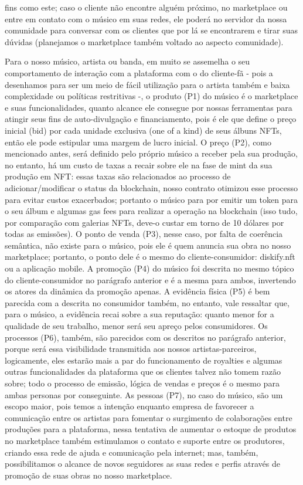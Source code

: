 \documentclass[onecolumn,12pt]{asme2ej}
\begin{document}
fins como este; caso o cliente não encontre alguém próximo, no marketplace ou entre em contato com o músico em suas redes, ele poderá no servidor da nossa comunidade para conversar com os clientes que por lá se encontrarem e tirar suas dúvidas (planejamos o marketplace também voltado ao aspecto comunidade).

Para o nosso músico, artista ou banda, em muito se assemelha o seu comportamento de interação com a plataforma com o do cliente-fã - pois a desenhamos para ser um meio de fácil utilização para o artista também e baixa complexidade ou políticas restritivas -, o produto (P1) do músico é o marketplace e suas funcionalidades, quanto alcance ele consegue por nossas ferramentas para atingir seus fins de auto-divulgação e financiamento, pois é ele que define o preço inicial (bid) por cada unidade exclusiva (one of a kind) de seus álbuns NFTs, então ele pode estipular uma margem de lucro inicial. O preço (P2), como mencionado antes, será definido pelo próprio músico a receber pela sua produção, no entanto, há um custo de taxas a recair sobre ele na fase de mint da sua produção em NFT: essas taxas são relacionados ao processo de adicionar/modificar o status da blockchain, nosso contrato otimizou esse processo para evitar custos exacerbados; portanto o músico para por emitir um token para o seu álbum e algumas gas fees para realizar a operação na blockchain (isso tudo, por comparação com galerias NFTs, deve-o custar em torno de 10 dólares por todas as emissões). O ponto de venda (P3), nesse caso, por falta de coerência semântica, não existe para o músico, pois ele é quem anuncia sua obra no nosso marketplace; portanto, o ponto dele é o mesmo do cliente-consumidor: diskify.nft ou a aplicação mobile. A promoção (P4) do músico foi descrita no mesmo tópico do cliente-consumidor no parágrafo anterior e é a mesma para ambos, invertendo os atores da dinâmica da promoção apenas. A evidência física (P5) é bem parecida com a descrita no consumidor também, no entanto, vale ressaltar que, para o músico, a evidência recai sobre a sua reputação: quanto menor for a qualidade de seu trabalho, menor será seu apreço pelos consumidores. Os processos (P6), também, são parecidos com os descritos no parágrafo anterior, porque será essa visibilidade transmitida aos nossos artistas-parceiros, logicamente, eles estarão mais a par do funcionamento de royalties e algumas outras funcionalidades da plataforma que os clientes talvez não tomem razão sobre; todo o processo de emissão, lógica de vendas e preços é o mesmo para ambas personas por conseguinte. As pessoas (P7), no caso do músico, são um escopo maior, pois temos a intenção enquanto empresa de favorecer a comunicação entre os artistas para fomentar o surgimento de colaborações entre produções para a plataforma, nessa tentativa de aumentar o estoque de produtos no marketplace também estimulamos o contato e suporte entre os produtores, criando essa rede de ajuda e comunicação pela internet; mas, também, possibilitamos o alcance de novos seguidores as suas redes e perfis através de promoção de suas obras no nosso marketplace.
\end{document}
